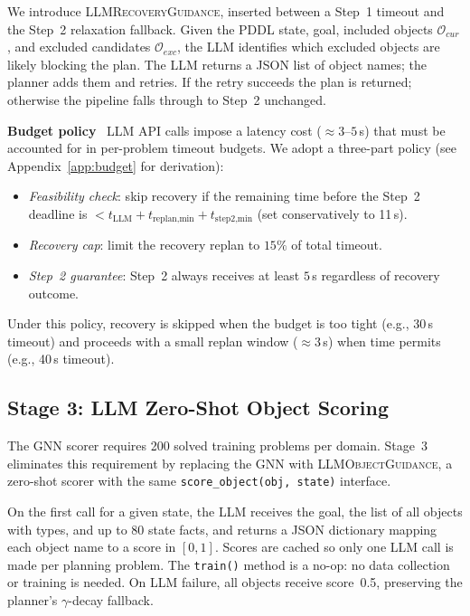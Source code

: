 \documentclass[letterpaper, 10pt, journal, twoside]{IEEEtran}
\newcommand{\myparagraph}[1]{\noindent\textbf{#1}~}
\begin{document}
We introduce \textsc{LLMRecoveryGuidance}, inserted between a Step~1 timeout and the Step~2 relaxation fallback.
Given the PDDL state, goal, included objects $\mathcal{O}_{cur}$, and excluded candidates $\mathcal{O}_{exc}$, the LLM identifies which excluded objects are likely blocking the plan.
The LLM returns a JSON list of object names; the planner adds them and retries.
If the retry succeeds the plan is returned; otherwise the pipeline falls through to Step~2 unchanged.

\myparagraph{Budget policy}
LLM API calls impose a latency cost (${\approx}3$--$5$\,s) that must be accounted for in per-problem timeout budgets.
We adopt a three-part policy (see Appendix~\ref{app:budget} for derivation):
\begin{itemize}[noitemsep,topsep=2pt]
  \item \emph{Feasibility check}: skip recovery if the remaining time before the Step~2 deadline is $< t_\text{LLM} + t_\text{replan,min} + t_\text{step2,min}$ (set conservatively to 11\,s).
  \item \emph{Recovery cap}: limit the recovery replan to $15\%$ of total timeout.
  \item \emph{Step~2 guarantee}: Step~2 always receives at least $5$\,s regardless of recovery outcome.
\end{itemize}
Under this policy, recovery is skipped when the budget is too tight (e.g., 30\,s timeout) and proceeds with a small replan window (${\approx}3$\,s) when time permits (e.g., 40\,s timeout).

\subsection{Stage 3: LLM Zero-Shot Object Scoring}
\label{sec:stage3}

The GNN scorer requires 200 solved training problems per domain.
Stage~3 eliminates this requirement by replacing the GNN with \textsc{LLMObjectGuidance}, a zero-shot scorer with the same \texttt{score\_object(obj, state)} interface.

On the first call for a given state, the LLM receives the goal, the list of all objects with types, and up to 80 state facts, and returns a JSON dictionary mapping each object name to a score in $[0, 1]$.
Scores are cached so only one LLM call is made per planning problem.
The \texttt{train()} method is a no-op: no data collection or training is needed.
On LLM failure, all objects receive score~0.5, preserving the planner's $\gamma$-decay fallback.
\end{document}
